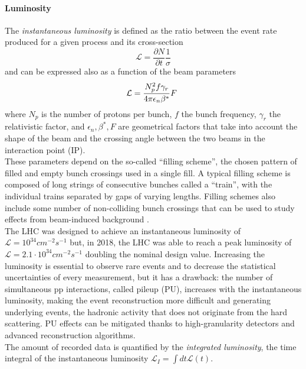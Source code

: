 \paragraph*{Luminosity}
The \emph{instantaneous luminosity} is defined as the ratio between the event rate produced for a given process and its cross-section
\begin{equation}
    \mathcal{L} = \frac{\partial N}{\partial t} \frac{1}{\sigma} 
\end{equation}
and can be expressed also as a function of the beam parameters
\begin{equation}
    \mathcal{L}=\frac{N_{p}^{2}f\gamma_{r}}{4\pi\epsilon_{n}\beta\sp{\ast}}F\ 
\end{equation}
where $N_p$ is the number of protons per bunch, $f$ the bunch frequency, $\gamma_r$ the relativistic factor, and $\epsilon_n, \beta^*, F$ are geometrical factors that take into account the shape of the beam and the crossing angle between the two beams in the interaction point (IP).\\
These parameters depend on the so-called “filling scheme”, the chosen pattern of filled and empty bunch crossings used in a single fill.
A typical filling scheme is composed of long strings of consecutive bunches called a “train”, with the individual trains separated by gaps of varying lengths. Filling schemes also include some number of non-colliding bunch crossings that can be used to study effects from beam-induced background \cite{CMSCollaboration2021PrecisionCMS}.\\
The LHC was designed to achieve an instantaneous luminosity of $\mathcal{L}=10^{34} cm^{-2}s^{-1}$ but, in 2018, the LHC was able to reach a peak luminosity of $\mathcal{L}=2.1 \cdot 10^{34} cm^{-2}s^{-1}$ doubling the nominal design value. Increasing the luminosity is essential to observe rare events and to decrease the statistical uncertainties of every measurement, but it has a drawback: the number of simultaneous pp interactions, called pileup (PU), increases with the instantaneous luminosity, making the event reconstruction more difficult and generating underlying events, \ie the hadronic activity that does not originate from the hard scattering. PU effects can be mitigated thanks to high-granularity detectors and advanced reconstruction algorithms.\\
The amount of recorded data is quantified by the \emph{integrated luminosity}, the time integral of the instantaneous luminosity $\mathcal{L}_I=\int dt \mathcal{L}(t)$.


